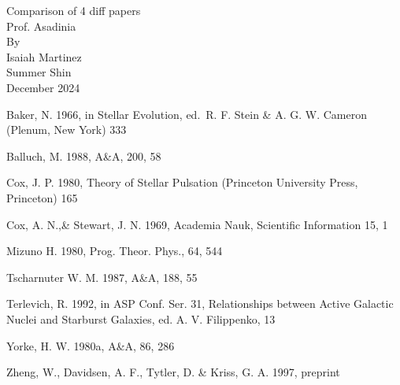 \documentclass[a4paper,10pt]{article}
\begin{document}
    \begin{titlepage}
        \centering
        Comparison of 4 diff papers\\
        [1.5in]
        
        Prof. Asadinia\\
        [1.5in]
        
        By\\
        Isaiah Martinez\\
        Summer Shin\\

        \vspace{\fill}
        December 2024\\
    \end{titlepage}

    
    
    
    

    \begin{thebibliography}{}

         Baker, N. 1966,
            in Stellar Evolution,
            ed.\ R. F. Stein \& A. G. W. Cameron
            (Plenum, New York) 333

         Balluch, M. 1988,
            A\&A, 200, 58

         Cox, J. P. 1980,
            Theory of Stellar Pulsation
            (Princeton University Press, Princeton) 165

         Cox, A. N.,\& Stewart, J. N. 1969,
            Academia Nauk, Scientific Information 15, 1

         Mizuno H. 1980,
            Prog. Theor. Phys., 64, 544
        
         Tscharnuter W. M. 1987,
            A\&A, 188, 55
        
         Terlevich, R. 1992, in ASP Conf. Ser. 31, 
            Relationships between Active Galactic Nuclei and Starburst Galaxies, 
            ed. A. V. Filippenko, 13

         Yorke, H. W. 1980a,
            A\&A, 86, 286

         Zheng, W., Davidsen, A. F., Tytler, D. \& Kriss, G. A.
            1997, preprint

    \end{thebibliography}
\end{document}
